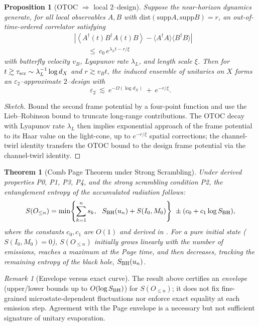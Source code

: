 \documentclass[a4paper,11pt]{article}
\theoremstyle{plain}
\newtheorem{theorem}{Theorem}
\newtheorem{proposition}{Proposition}
\theoremstyle{definition}
\theoremstyle{remark}
\newtheorem{remark}{Remark}
\begin{document}
\begin{proposition}[OTOC $\Rightarrow$ local $2$--design]\label{prop:otoc-design}
Suppose the near-horizon dynamics generate, for all local observables $A,B$ with $\mathrm{dist}(\mathrm{supp}A,\mathrm{supp}B)=r$, an out-of-time-ordered correlator satisfying
\begin{equation}
\begin{split}
&\left|\left\langle A^\dagger(t) B^\dagger A(t) B \right\rangle - \langle A^\dagger A\rangle \langle B^\dagger B\rangle\right| \\
&\qquad \le\ c_0\, e^{\lambda_L t - r/\xi}
\end{split}
\end{equation}
with butterfly velocity $v_B$, Lyapunov rate $\lambda_L$, and length scale $\xi$. Then for $t\gtrsim \tau_{\rm scr}\sim \lambda_L^{-1}\log d_X$ and $r\gtrsim v_B t$, the induced ensemble of unitaries on $X$ forms an $\varepsilon_2$--approximate $2$--design with
\begin{equation}
\varepsilon_2 \ \lesssim\ e^{-\Omega(\log d_X)}\ +\ e^{-r/\xi}.
\end{equation}
\end{proposition}
\begin{proof}[Sketch]
Bound the second frame potential by a four-point function and use the Lieb--Robinson bound to truncate long-range contributions. The OTOC decay with Lyapunov rate $\lambda_L$ then implies exponential approach of the frame potential to its Haar value on the light-cone, up to $e^{-r/\xi}$ spatial corrections; the channel-twirl identity transfers the OTOC bound to the design frame potential via the channel-twirl identity.
\end{proof}

\begin{theorem}[Comb Page Theorem under Strong Scrambling]
\label{thm:comb-page}
Under derived properties P0, P1, P3, P4, and the strong scrambling condition P2, the entanglement entropy of the accumulated radiation follows:
\begin{equation}
\label{eq:comb-page}
S(O_{\le n}) = \min\!\left\{\sum_{k=1}^n s_k,\ \ S_{\rm BH}(u_n) + S(I_0, M_0)\right\} \ \pm (c_0 + c_1\log S_{\rm BH}),
\end{equation}
%
where the constants $c_0, c_1$ are $O(1)$ and derived in . For a pure initial state ($S(I_0, M_0)=0$), $S(O_{\le n})$ initially grows linearly with the number of emissions, reaches a maximum at the Page time, and then decreases, tracking the remaining entropy of the black hole, $S_{\rm BH}(u_n)$.
\end{theorem}
\begin{remark}[Envelope versus exact curve]
The result above certifies an \emph{envelope} (upper/lower bounds up to $O(\log S_{\rm BH})$) for $S(O_{\le n})$; it does not fix fine-grained microstate-dependent fluctuations nor enforce exact equality at each emission step. Agreement with the Page envelope is a necessary but not sufficient signature of unitary evaporation.
\end{remark}
\end{document}

